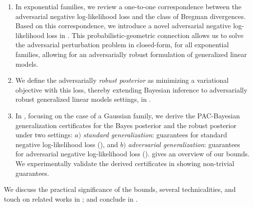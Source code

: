 \begin{enumerate}[($i$), topsep=0pt,itemsep=-1ex,partopsep=1ex,parsep=1ex]
    \item In exponential families, we review a one-to-one correspondence between the adversarial negative log-likelihood loss and the class of Bregman divergences. %
    Based on this correspondence, we introduce a novel adversarial negative log-likelihood loss in . 
    This probabilistic-geometric connection allows us to solve the adversarial perturbation problem in closed-form, for all exponential families, allowing for an adversarially robust formulation of generalized linear models.
    \item We define the adversarially \emph{robust posterior} as minimizing a variational objective with this loss, thereby extending Bayesian inference to adversarially robust generalized linear models settings, in .
\item In , focusing on the case of a Gaussian family, we derive the PAC-Bayesian generalization certificates for the Bayes posterior and the robust posterior under two settings: %
$a)$ \emph{standard generalization}: guarantees for standard negative log-likelihood loss (),
and $b)$ \emph{adversarial generalization}: guarantees for adversarial negative log-likelihood loss (). 
 gives an overview of our bounds. 
We experimentally validate the derived certificates in  showing non-trivial guarantees.
\end{enumerate}
We discuss the practical significance of the bounds, several technicalities, %
and touch on related works in ;  and conclude in .






